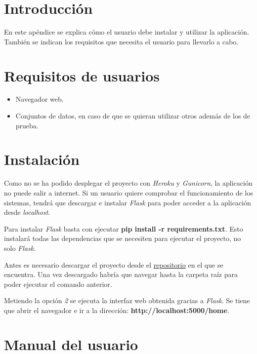 
\section{Introducción}
En este apéndice se explica cómo el usuario debe instalar y utilizar la aplicación. También se indican los requisitos que necesita el usuario para llevarlo a cabo.

\section{Requisitos de usuarios}
\begin{itemize}
\tightlist
\item Navegador web.
\item Conjuntos de datos, en caso de que se quieran utilizar otros además de los de prueba.
\end{itemize}

\section{Instalación}
Como no se ha podido desplegar el proyecto con \textit{Heroku} y \textit{Gunicorn}, la aplicación no puede salir a internet. Si un usuario quiere comprobar el funcionamiento de los sistemas, tendrá que descargar e instalar \textit{Flask} para poder acceder a la aplicación desde \textit{localhost}.

Para instalar \textit{Flask} basta con ejecutar \textbf{pip install -r requirements.txt}. Esto instalará todas las dependencias que se necesiten para ejecutar el proyecto, no solo \textit{Flask}. 

Antes es necesario descargar el proyecto desde el \href{https://github.com/rnc0011/SistemaRecomendacionTFG}{repositorio} en el que se encuentra. Una vez descargado habría que navegar hasta la carpeta raíz para poder ejecutar el comando anterior.




Metiendo la opción \textit{2} se ejecuta la interfaz web obtenida gracias a \textit{Flask}. Se tiene que abrir el navegador e ir a la dirección: \textbf{http://localhost:5000/home}.


\section{Manual del usuario}


